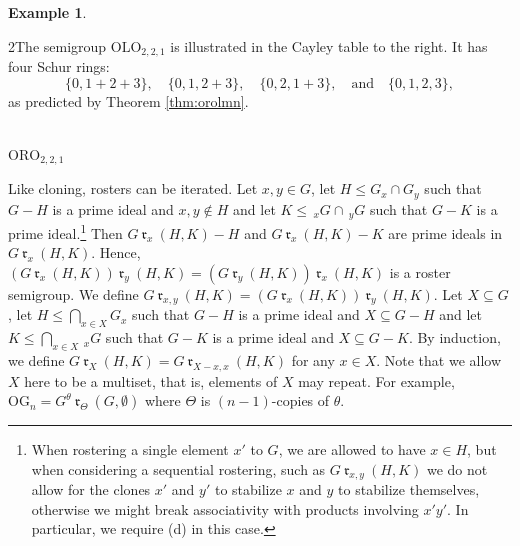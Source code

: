 \documentclass{article}
\theoremstyle{plain}
\theoremstyle{definition}
\newtheorem{Exam}[Thm]{Example}
\newcommand{\ORO}{\mathrm{ORO}}
\newcommand{\OLO}{\mathrm{OLO}}
\newcommand{\OG}{\mathrm{OG}}
\renewcommand{\r}[1]{\ \mathfrak{r}_{#1}\ }
\begin{document}
\begin{Exam} 
\begin{multicols}{2}The semigroup $\OLO_{2,2,1}$ is illustrated in the Cayley table to the right. It has four Schur rings: \[\{0,1+2+3\},\quad \{0,1,2+3\},\quad \{0,2,1+3\},\quad\text{and}\quad\{0,1,2,3\},\] as predicted by Theorem \ref{thm:orolmn}.
\begin{center}
\\$\ORO_{2,2,1}$
\end{center}
\end{multicols}
\end{Exam}

Like cloning, rosters can be iterated. Let $x,y\in G$, let $H\le G_x\cap G_y$ such that $G-H$ is a prime ideal and $x,y\notin H$ and let $K\le\, _xG\cap\, _yG$ such that $G-K$ is a prime ideal.\footnote{When rostering a single element $x'$ to $G$, we are allowed to have $x\in H$, but when considering a sequential rostering, such as $G\r{x,y} (H,K)$ we do not allow for the clones $x'$ and $y'$ to stabilize $x$ and $y$ to stabilize themselves, otherwise we might break associativity with products involving $x'y'$. In particular, we require (d) in this case.} Then $G\r{x} (H,K) - H$ and $G\r{x} (H,K)-K$ are prime ideals in $G\r{x} (H,K)$. Hence, $(G\r x (H,K))\r y(H,K) = (G\r y (H,K))\r x(H,K)$ is a roster semigroup. We define \label{rosterdual}$G\r{x,y} (H,K) = (G\r x (H,K))\r y(H,K)$.  Let $X\subseteq G$, let $H\le \bigcap_{x\in X} G_x$ such that $G-H$ is a prime ideal and $X\subseteq G-H$ and let $K\le \bigcap_{x\in X}\,_xG$ such that $G-K$ is a prime ideal and $X\subseteq G-K$. By induction, we define \label{rinduction}$G\r X (H,K) = G\r{X-x,x} (H,K)$ for any $x\in X$. Note that we allow $X$ here to be a multiset, that is, elements of $X$ may repeat. For example, $\OG_n = G^\theta\r\Theta (G,\emptyset)$ where $\Theta$ is $(n-1)$-copies of $\theta$.
\end{document}
